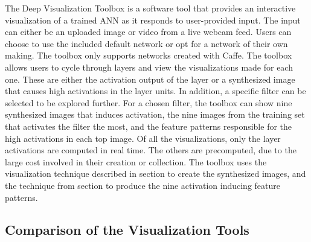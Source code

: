The Deep Visualization Toolbox is a software tool that provides an interactive visualization of a trained ANN as it responds to user-provided input. The input can either be an uploaded image or video from a live webcam feed. Users can choose to use the included default network or opt for a network of their own making. The toolbox only supports networks created with Caffe. The toolbox allows users to cycle through layers and view the visualizations made for each one. These are either the activation output of the layer or a synthesized image that causes high activations in the layer units. In addition, a specific filter can be selected to be explored further. For a chosen filter, the toolbox can show nine synthesized images that induces activation, the nine images from the training set that activates the filter the most, and the feature patterns responsible for the high activations in each top image. Of all the visualizations, only the layer activations are computed in real time. The others are precomputed, due to the large cost involved in their creation or collection. The toolbox uses the visualization technique described in section \cite{deep-vis} to create the synthesized images, and the technique from section \cite{deconv-net} to produce the nine activation inducing feature patterns.


\subsection{Comparison of the Visualization Tools}

